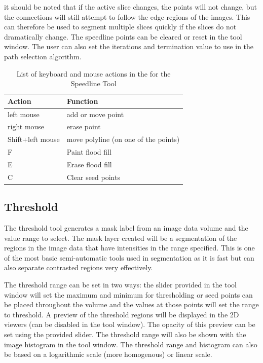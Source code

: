\documentclass[fleqn,11pt,openany]{book}
\begin{document}
it should be noted that if the active slice changes, the points will not change, but the connections will still attempt to follow the edge regions of the images.  This can therefore be used to segment multiple slices quickly if the slices do not dramatically change.  The speedline points can be cleared or reset in the tool window.  The user can also set the iterations and termination value to use in the path selection algorithm.  

\begin{table}[h!]
\label{tab:speedlinekey}
\caption{List of keyboard and mouse actions in the for the Speedline Tool}
\begin{tabular}{|l|l|}
\hline
{\bf Action} & {\bf Function}\\
\hline 
left mouse & add or move point \\
\hline
right mouse & erase point\\
\hline
Shift+left mouse & move polyline (on one of the points)\\
\hline
F & Paint flood fill\\
\hline
E & Erase flood fill\\ 
\hline
C & Clear seed points\\
\hline
\end{tabular}
\end{table}


\subsection{Threshold}

The threshold tool generates a mask label from an image data volume and the value range to select.  The mask layer created will be a segmentation of the regions in the image data that have intensities in the range specified.  This is one of the most basic semi-automatic tools used in segmentation as it is fast but can also separate contrasted regions very effectively.  

The threshold range can be set in two ways: the slider provided in the tool window will set the maximum and minimum for thresholding or seed points can be placed throughout the volume and the values at those points will set the range to threshold. A preview of the threshold regions will be displayed in the 2D viewers (can be disabled in the tool window).   The opacity of this preview can be set using the provided slider.   The threshold range will also be shown with the image histogram in the tool window. The threshold range and histogram can also be based on a logarithmic scale (more homogenous) or linear scale.  
\end{document}
